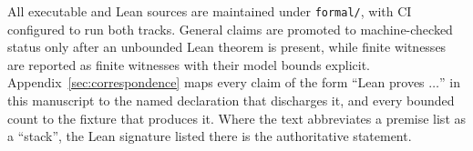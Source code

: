 All executable and Lean sources are maintained under \texttt{formal/}, with CI configured to run both tracks. General claims are promoted to machine-checked status only after an unbounded Lean theorem is present, while finite witnesses are reported as finite witnesses with their model bounds explicit. Appendix~\ref{sec:correspondence} maps every claim of the form ``Lean proves \(\dots\)'' in this manuscript to the named declaration that discharges it, and every bounded count to the fixture that produces it. Where the text abbreviates a premise list as a ``stack'', the Lean signature listed there is the authoritative statement.
